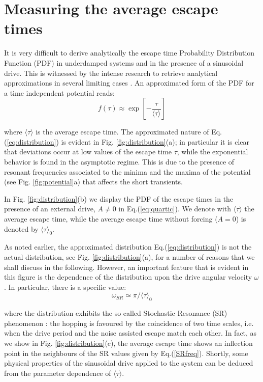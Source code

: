 \documentclass[conference]{IEEEtran}
\newcommand{\beq}{\begin{equation}}
\newcommand{\eeq}{\end{equation}}
\begin{document}
\section{Measuring the average escape times}
\label{sect:estimate}
It is very difficult to derive analytically the escape time Probability Distribution Function (PDF) in underdamped systems and in the presence of a sinusoidal drive.
This is witnessed by the intense research to retrieve analytical approximations in several limiting cases \cite{Zhou90,Berglund05}.
An approximated form of the PDF for a time independent potential reads:
\beq 
f(\tau) \approx \exp \left[-  \frac{ \tau}{\langle \tau \rangle} \right]
\label{eq:distribution}
\eeq

\noindent where $\langle \tau \rangle $ is the average escape time. 
The approximated nature of Eq.(\ref{eq:distribution}) is evident in Fig. \ref{fig:distribution}(a); in particular it is clear that deviations occur at low values of the escape time $\tau$, while the exponential behavior is found in the asymptotic regime. 
This is due to the presence of resonant frequencies associated to the minima and the maxima of the potential (see Fig. \ref{fig:potential}a) that affects the short transients.

In Fig. \ref{fig:distribution}(b) we display the PDF of the escape times in the presence of an external  drive, $A\neq 0$ in Eq.(\ref{eq:quartic}). 
We denote with $\langle \tau \rangle $ the average escape time, while the average escape time without forcing ($A=0$) is denoted by $\langle \tau \rangle_0 $. 

As noted earlier, the approximated distribution Eq.(\ref{eq:distribution}) is not the actual distribution, see Fig. \ref{fig:distribution}(a), for a number of reasons that we shall discuss in the following. 
However, an important feature that is evident in this figure is the dependence of the distribution upon the drive angular velocity $\omega$. 
In particular, there is a specific value:
\beq
\omega_{SR}\simeq \pi / \langle \tau \rangle _0
\label{SRfreq}
\eeq

\noindent  where the distribution exhibits the so called Stochastic Resonance (SR) phenomenon \cite{Gammaitoni98}: the hopping is favoured by the coincidence of two time scales, i.e. when the drive period and the noise assisted escape match each other. 
In fact, as we show in Fig. \ref{fig:distribution}(c), the average escape time shows an inflection point in the neighbours of the SR values given by Eq.(\ref{SRfreq}). 
Shortly, some physical properties of the sinusoidal drive applied to the system can be deduced from the parameter dependence of  $\langle \tau \rangle$. 
\end{document}
